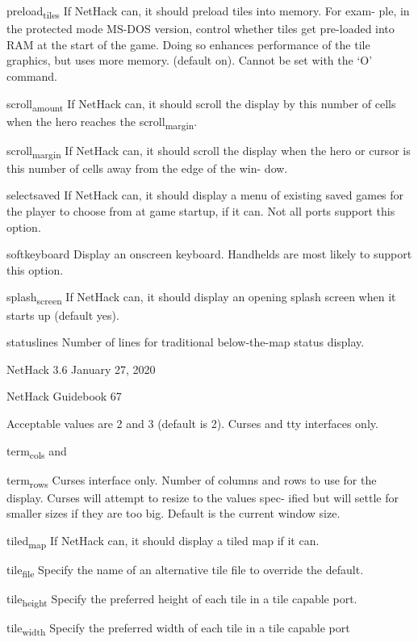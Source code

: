 \documentclass[11pt]{article}
\begin{document}
preload\textsubscript{tiles}
 If NetHack can, it should preload tiles into memory. For exam-
 ple, in the protected mode MS-DOS version, control whether
 tiles get pre-loaded into RAM at the start of the game.  Doing
 so enhances performance of the tile graphics, but uses more
 memory. (default on). Cannot be set with the `O' command.

scroll\textsubscript{amount}
 If NetHack can, it should scroll the display by this number of
 cells when the hero reaches the scroll\textsubscript{margin}.

scroll\textsubscript{margin}
 If NetHack can, it should scroll the display when the hero or
 cursor is this number of cells away from the edge of the win-
 dow.

selectsaved
 If NetHack can, it should display a menu of existing saved
 games for the player to choose from at game startup, if it can.
 Not all ports support this option.

softkeyboard
 Display an onscreen keyboard.  Handhelds are most likely to
 support this option.

splash\textsubscript{screen}
 If NetHack can, it should display an opening splash screen when
 it starts up (default yes).

statuslines
 Number of lines for traditional below-the-map status display.


NetHack 3.6                   January 27, 2020





NetHack Guidebook                       67



Acceptable values are 2 and 3 (default is 2). Curses and tty
interfaces only.

term\textsubscript{cols} and

term\textsubscript{rows}
 Curses interface only. Number of columns and rows to use for
 the display. Curses will attempt to resize to the values spec-
 ified but will settle for smaller sizes if they are too big.
 Default is the current window size.

tiled\textsubscript{map}
 If NetHack can, it should display a tiled map if it can.

tile\textsubscript{file}
 Specify the name of an alternative tile file to override the
 default.

tile\textsubscript{height}
 Specify the preferred height of each tile in a tile capable
 port.

tile\textsubscript{width}
 Specify the preferred width of each tile in a tile capable port
\end{document}
